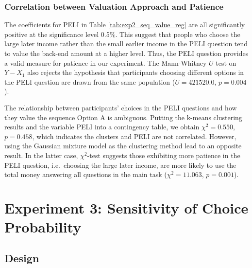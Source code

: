 \documentclass[
  12pt,
]{article}
\begin{document}
\hypertarget{correlation-between-valuation-approach-and-patience}{%
\subsubsection{Correlation between Valuation Approach and
Patience}\label{correlation-between-valuation-approach-and-patience}}

The coefficients for PELI in Table \ref{tab:exp2_seq_value_reg} are all
significantly positive at the significance level 0.5\%. This suggest
that people who choose the large later income rather than the small
earlier income in the PELI question tend to value the back-end amount at
a higher level. Thus, the PELI question provides a valid measure for
patience in our experiment. The Mann-Whitney \(U\) test on \(Y-X_1\)
also rejects the hypothesis that participants choosing different options
in the PELI question are drawn from the same population (\(U=421520.0\),
\(p=0.004\)).

The relationship between participants' choices in the PELI questions and
how they value the sequence Option A is ambiguous. Putting the k-means
clustering results and the variable PELI into a contingency table, we
obtain \(\chi^2 = 0.550\), \(p=0.458\), which indicates the clusters and
PELI are not correlated. However, using the Gaussian mixture model as
the clustering method lead to an opposite result. In the latter case,
\(\chi^2\)-test suggests those exhibiting more patience in the PELI
question, i.e.~choosing the large later income, are more likely to use
the total money answering all questions in the main task
(\(\chi^2 = 11.063\), \(p = 0.001\)).

\hypertarget{experiment-3-sensitivity-of-choice-probability}{%
\section{Experiment 3: Sensitivity of Choice
Probability}\label{experiment-3-sensitivity-of-choice-probability}}

\hypertarget{design-2}{%
\subsection{Design}\label{design-2}}
\end{document}
